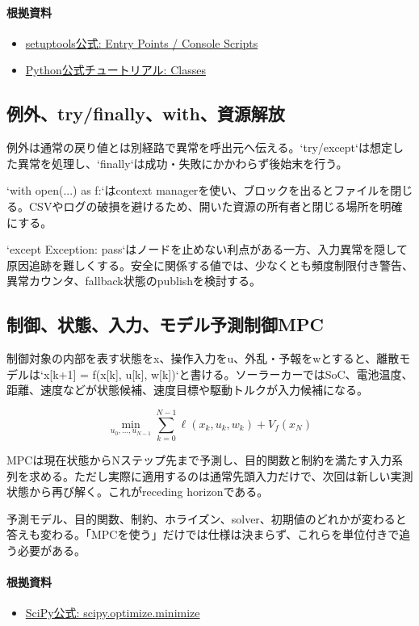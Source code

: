 \documentclass[a4paper,11pt]{article}
\begin{document}
\paragraph{根拠資料}
\begin{itemize}[leftmargin=1.6em]
\item \href{https://setuptools.pypa.io/en/latest/userguide/entry_point.html}{setuptools公式: Entry Points / Console Scripts}
\item \href{https://docs.python.org/3/tutorial/classes.html}{Python公式チュートリアル: Classes}
\end{itemize}

\subsection{例外、try/finally、with、資源解放}
例外は通常の戻り値とは別経路で異常を呼出元へ伝える。`try/except`は想定した異常を処理し、`finally`は成功・失敗にかかわらず後始末を行う。


`with open(...) as f:`はcontext managerを使い、ブロックを出るとファイルを閉じる。CSVやログの破損を避けるため、開いた資源の所有者と閉じる場所を明確にする。


`except Exception: pass`はノードを止めない利点がある一方、入力異常を隠して原因追跡を難しくする。安全に関係する値では、少なくとも頻度制限付き警告、異常カウンタ、fallback状態のpublishを検討する。



\subsection{制御、状態、入力、モデル予測制御MPC}
制御対象の内部を表す状態をx、操作入力をu、外乱・予報をwとすると、離散モデルは`x[k+1] = f(x[k], u[k], w[k])`と書ける。ソーラーカーではSoC、電池温度、距離、速度などが状態候補、速度目標や駆動トルクが入力候補になる。


\[
\min_{u_0,\ldots,u_{N-1}} \sum_{k=0}^{N-1}\ell(x_k,u_k,w_k)+V_f(x_N)
\]

MPCは現在状態からNステップ先まで予測し、目的関数と制約を満たす入力系列を求める。ただし実際に適用するのは通常先頭入力だけで、次回は新しい実測状態から再び解く。これがreceding horizonである。


予測モデル、目的関数、制約、ホライズン、solver、初期値のどれかが変わると答えも変わる。「MPCを使う」だけでは仕様は決まらず、これらを単位付きで追う必要がある。

\paragraph{根拠資料}
\begin{itemize}[leftmargin=1.6em]
\item \href{https://docs.scipy.org/doc/scipy/reference/generated/scipy.optimize.minimize.html}{SciPy公式: scipy.optimize.minimize}
\end{itemize}
\end{document}
